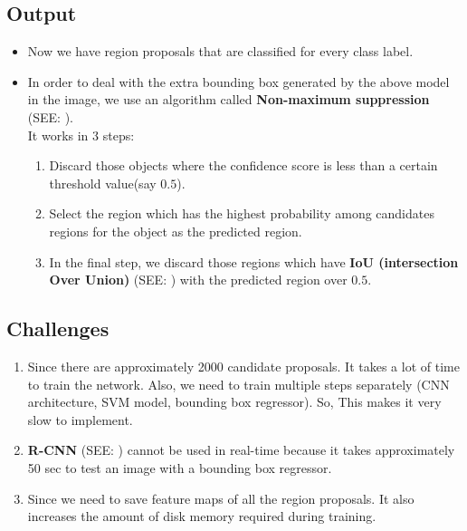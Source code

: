 \subsection*{Output}
\begin{itemize}
    \item Now we have region proposals that are classified for every class label. 
    
    \item In order to deal with the extra bounding box generated by the above model in the image, we use an algorithm called \textbf{Non-maximum suppression} (SEE: ).\\
    It works in 3 steps:
    \begin{enumerate}
        \item Discard those objects where the confidence score is less than a certain threshold value(say $0.5$).

        \item Select the region which has the highest probability among candidates regions for the object as the predicted region.

        \item In the final step, we discard those regions which have \textbf{IoU (intersection Over Union)} (SEE: ) with the predicted region over $0.5$.

    \end{enumerate}
\end{itemize}

\subsection*{Challenges}
\begin{enumerate}
    \item Since there are approximately 2000 candidate proposals. It takes a lot of time to train the network. Also, we need to train multiple steps separately (CNN architecture, SVM model, bounding box regressor). So, This makes it very slow to implement.

    \item \textbf{R-CNN} (SEE: ) cannot be used in real-time because it takes approximately 50 sec to test an image with a bounding box regressor.

    \item Since we need to save feature maps of all the region proposals. It also increases the amount of disk memory required during training.
\end{enumerate}


